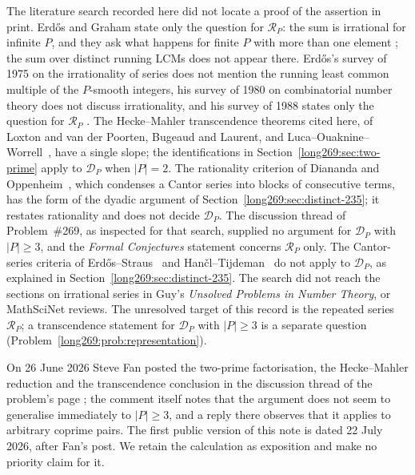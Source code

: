 \documentclass[11pt]{article}
\theoremstyle{remark}
\theoremstyle{plain}
\begin{document}
The literature search recorded here did not locate a proof of the
assertion in print. Erd\H{o}s and Graham state only the question for $\mathcal R_P$: the sum is irrational
for infinite $P$, and they ask what happens for finite $P$ with more than
one element \cite[p.~65]{erdosgraham1980}; the sum over distinct running LCMs does not
appear there.  Erd\H{o}s's survey of
1975 on the irrationality of series \cite{erdos1975} does not mention the
running least common multiple of the $P$-smooth integers, his survey of
1980 on combinatorial number theory \cite{erdos1980survey} does not discuss
irrationality, and his survey of
1988 states only the question for $\mathcal R_P$ \cite[p.~106]{erdos1988}.
The Hecke--Mahler transcendence theorems cited here, of Loxton and
van der Poorten, Bugeaud and Laurent, and
Luca--Ouaknine--Worrell~\cite{lucaouaknineworrell2025}, have a single
slope; the identifications in Section~\ref{long269:sec:two-prime}
apply to $\mathcal D_P$ when $|P|=2$.  The rationality
criterion of Diananda and Oppenheim~\cite{dianandaoppenheim1955}, which
condenses a Cantor series into blocks of consecutive terms, has the form of
the dyadic argument of Section~\ref{long269:sec:distinct-235}; it restates
rationality and does not decide $\mathcal D_P$.
The discussion thread of Problem~\#269, as inspected for that search,
supplied no argument for $\mathcal D_P$ with $|P|\ge3$, and the
\emph{Formal Conjectures} statement
\cite{formalconjectures269} concerns $\mathcal R_P$ only.  The Cantor-series
criteria of Erd\H{o}s--Straus~\cite[Theorem~2.1]{erdosstraus1974} and
Han\v{c}l--Tijdeman~\cite[Theorem~3.1]{hancltijdeman2004} do not apply to
$\mathcal D_P$, as explained in Section~\ref{long269:sec:distinct-235}.  The
search did not reach the sections on irrational series in Guy's
\emph{Unsolved Problems in Number Theory}, or MathSciNet reviews.  The unresolved target of this record is the
repeated series $\mathcal R_P$; a transcendence statement for $\mathcal D_P$
with $|P|\ge3$ is a separate question
(Problem~\ref{long269:prob:representation}).

On 26 June 2026 Steve Fan posted the two-prime factorisation, the Hecke--Mahler reduction and the transcendence
conclusion in the discussion thread of the problem's page
\cite{fan2026comment}; the comment itself notes that the argument does not seem
to generalise immediately to $|P|\ge3$, and a reply there observes that it
applies to arbitrary coprime pairs.  The first public version of this
note is dated 22 July 2026, after Fan's post.  We retain
the calculation as exposition and make no priority claim for it.
\end{document}
